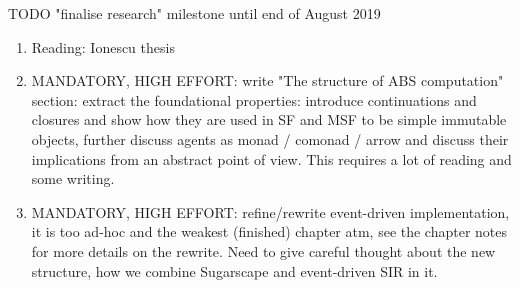 \documentclass[oneside]{book}
\begin{document}
TODO "finalise research" milestone until end of August 2019
\begin{enumerate}
	\item Reading: Ionescu thesis

	\item MANDATORY, HIGH EFFORT: write "The structure of ABS computation" section: extract the foundational properties: introduce continuations and closures and show how they are used in SF and MSF to be simple immutable objects, further discuss agents as monad / comonad / arrow and discuss their implications from an abstract point of view. This requires a lot of reading and some writing.

	\item MANDATORY, HIGH EFFORT: refine/rewrite event-driven implementation, it is too ad-hoc and the weakest (finished) chapter atm, see the chapter notes for more details on the rewrite. Need to give careful thought about the new structure, how we combine Sugarscape and event-driven SIR in it.
	
\end{enumerate}
\end{document}
